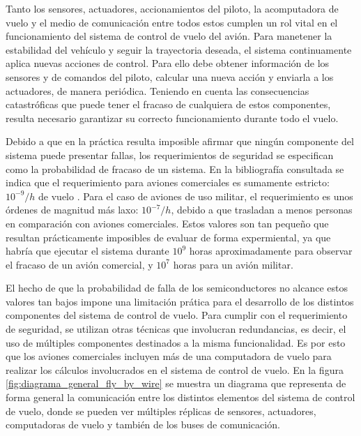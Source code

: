 Tanto los sensores, actuadores, accionamientos del piloto, la acomputadora de vuelo y el medio de comunicación entre todos estos cumplen un rol vital en el funcionamiento del sistema de control de vuelo del avión. Para manetener la estabilidad del vehículo y seguir la trayectoria deseada, el sistema continuamente aplica nuevas acciones de control. Para ello debe obtener información de los sensores y de comandos del piloto, calcular una nueva acción y enviarla a los actuadores, de manera periódica. Teniendo en cuenta las consecuencias catastróficas que puede tener el fracaso de cualquiera de estos componentes, resulta necesario garantizar su correcto funcionamiento durante todo el vuelo.

Debido a que en la práctica resulta imposible afirmar que ningún componente del sistema puede presentar fallas, los requerimientos de seguridad se especifican como la probabilidad de fracaso de un sistema. En la bibliografía consultada se indica que el requerimiento para aviones comerciales es sumamente estricto: $10^{-9}/h$ de vuelo \cite[p.~217]{collinson2023introduction} \cite{yeh1996triple} \cite{lala1994architectural}. Para el caso de aviones de uso militar, el requerimiento es unos órdenes de magnitud más laxo: $10^{-7}/h$, debido a que trasladan a menos personas en comparación con aviones comerciales. Estos valores son tan pequeño que resultan prácticamente imposibles de evaluar de forma expermiental, ya que habría que ejecutar el sistema durante $10^9$ horas aproximadamente para observar el fracaso de un avión comercial, y $10^7$ horas para un avión militar.

El hecho de que la probabilidad de falla de los semiconductores no alcance estos valores tan bajos \cite[p.~4]{Fulton2014AirborneEH} impone una limitación prática para el desarrollo de los distintos componentes del sistema de control de vuelo. Para cumplir con el requerimiento de seguridad, se utilizan otras técnicas que involucran redundancias, es decir, el uso de múltiples componentes destinados a la misma funcionalidad. Es por esto que los aviones comerciales incluyen más de una computadora de vuelo para realizar los cálculos involucrados en el sistema de control de vuelo. En la figura \ref{fig:diagrama_general_fly_by_wire} se muestra un diagrama que representa de forma general la comunicación entre los distintos elementos del sistema de control de vuelo, donde se pueden ver múltiples réplicas de sensores, actuadores, computadoras de vuelo y también de los buses de comunicación.




